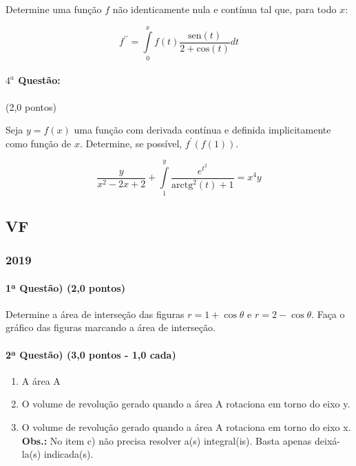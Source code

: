 \documentclass[12pt,a4paper]{article}
\begin{document}
Determine uma função $f$ não identicamente nula e contínua tal que, para todo $x$:

$$f^{\prime \prime} = \displaystyle\int\limits_0^x f(t)\dfrac{\textrm{sen}(t)}{2+\textrm{cos}(t)}dt$$

\paragraph{$4^a$ Questão:} (2,0 pontos)

Seja $y=f(x)$ uma função com derivada contínua e definida implicitamente como função de $x$. Determine, se possível, $f^\prime(f(1))$.

$$\dfrac{y}{x^2-2x+2} + \displaystyle\int\limits_1^y \dfrac{e^{t^2}}{\textrm{arctg}^2(t)+1} = x^4y$$

\newpage
\subsection{VF}


\subsubsection{2019}

\paragraph{1ª Questão) (2,0 pontos)}


Determine a área de interseção das figuras $r = 1 + \cos{\theta}$ e $r = 2 - \cos{\theta}.$ Faça o gráfico das figuras marcando a área de interseção.\\

\paragraph{2ª Questão) (3,0 pontos - 1,0 cada)}


\begin{enumerate}[label=(\alph*)]
    \item A área A
    \item O volume de revolução gerado quando a área A rotaciona em torno do eixo y.
    \item O volume de revolução gerado quando a área A rotaciona em torno do eixo x.\\
    \textbf{Obs.:} No item c) não precisa resolver a(s) integral(is). Basta apenas deixá-la(s) indicada(s).


\end{enumerate}
\end{document}
